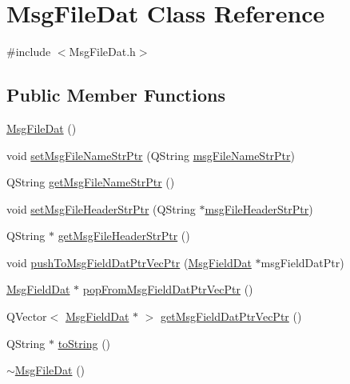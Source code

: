 \hypertarget{class_msg_file_dat}{\section{Msg\-File\-Dat Class Reference}
\label{class_msg_file_dat}
}


{\ttfamily \#include $<$Msg\-File\-Dat.\-h$>$}

\subsection*{Public Member Functions}
\begin{DoxyCompactItemize}
\item 
\hyperlink{class_msg_file_dat_a38addd578d69fa74d889997ba622787b}{Msg\-File\-Dat} ()
\item 
void \hyperlink{class_msg_file_dat_a01e0af216ae4b34671b508add6f85dad}{set\-Msg\-File\-Name\-Str\-Ptr} (Q\-String \hyperlink{class_msg_file_dat_a6fe034583c677bc9a21b96061fe80898}{msg\-File\-Name\-Str\-Ptr})
\item 
Q\-String \hyperlink{class_msg_file_dat_ab5692411f489aceeddf8b2c25d194518}{get\-Msg\-File\-Name\-Str\-Ptr} ()
\item 
void \hyperlink{class_msg_file_dat_a55cad07756a82223a40955f5f6214e44}{set\-Msg\-File\-Header\-Str\-Ptr} (Q\-String $\ast$\hyperlink{class_msg_file_dat_aadbf86f44cd8bd440bd6ecbff36c540d}{msg\-File\-Header\-Str\-Ptr})
\item 
Q\-String $\ast$ \hyperlink{class_msg_file_dat_a75cd1be1260eeae86d617451713dbfdd}{get\-Msg\-File\-Header\-Str\-Ptr} ()
\item 
void \hyperlink{class_msg_file_dat_a63d1abb4bd09980772e617aed0cdf1d0}{push\-To\-Msg\-Field\-Dat\-Ptr\-Vec\-Ptr} (\hyperlink{class_msg_field_dat}{Msg\-Field\-Dat} $\ast$msg\-Field\-Dat\-Ptr)
\item 
\hyperlink{class_msg_field_dat}{Msg\-Field\-Dat} $\ast$ \hyperlink{class_msg_file_dat_a11a9cddfd2dec07399e39caa65309a04}{pop\-From\-Msg\-Field\-Dat\-Ptr\-Vec\-Ptr} ()
\item 
Q\-Vector$<$ \hyperlink{class_msg_field_dat}{Msg\-Field\-Dat} $\ast$ $>$ \hyperlink{class_msg_file_dat_a18cdf2cf5e944c86e5dcbe6e8703f8a7}{get\-Msg\-Field\-Dat\-Ptr\-Vec\-Ptr} ()
\item 
Q\-String $\ast$ \hyperlink{class_msg_file_dat_ae38a3ebfdaa448cb55ba37feecb7e56c}{to\-String} ()
\item 
\hyperlink{class_msg_file_dat_a63ad4701855d00d4715ac695e0fce850}{$\sim$\-Msg\-File\-Dat} ()
\end{DoxyCompactItemize}
